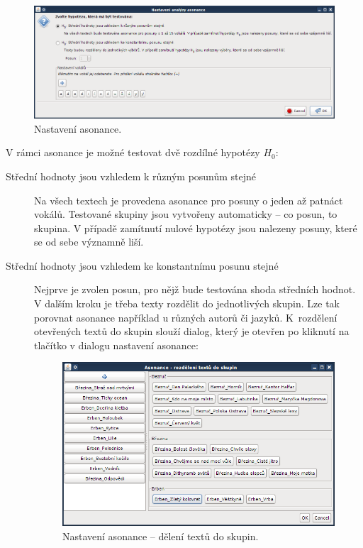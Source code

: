\documentclass[dp.tex]{subfiles}
\begin{document}
\begin{figure}[H]
\centering
\includegraphics[max width=\textwidth,keepaspectratio=true]{imgs-60-aplikace/gui-asonance-settings}
\caption{Nastavení asonance.}
\label{fig:gui-asonance-settings}
\end{figure}

V rámci asonance je možné testovat dvě rozdílné hypotézy $H_0$:
\begin{description}
\item[Střední hodnoty jsou vzhledem k různým posunům stejné] Na všech textech je provedena asonance pro posuny o jeden až patnáct vokálů. Testované skupiny jsou vytvořeny automaticky -- co posun, to skupina. V případě zamítnutí nulové hypotézy jsou nalezeny posuny, které se od sebe významně liší. 

\item[Střední hodnoty jsou vzhledem ke konstantnímu posunu stejné] Nejprve je zvolen posun, pro nějž bude testována shoda středních hodnot. V dalším kroku je třeba texty rozdělit do jednotlivých skupin. Lze tak porovnat asonance například u různých autorů či jazyků. K~rozdělení otevřených textů do skupin slouží dialog, který je otevřen po kliknutí na tlačítko  v dialogu nastavení asonance:
\begin{figure}[H]
\centering
\includegraphics[max width=\textwidth,keepaspectratio=true]{imgs-60-aplikace/gui-asonance-settings-groups}
\caption{Nastavení asonance -- dělení textů do skupin.}
\label{fig:gui-asonance-settings-groups}
\end{figure}

\end{description}
\end{document}
